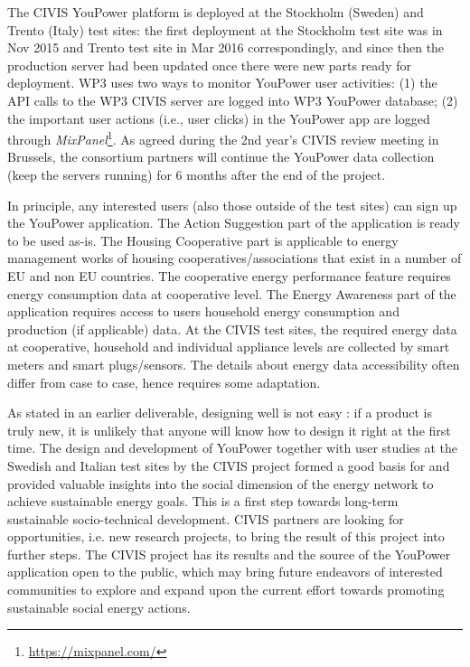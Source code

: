 The CIVIS YouPower platform is deployed at the Stockholm (Sweden) and Trento (Italy) test sites:  the first deployment at the Stockholm test site was in Nov 2015 and Trento test site in Mar 2016 correspondingly, and since then the production server had been updated once there were new parts ready for deployment. WP3 uses two ways to monitor YouPower user activities: (1) the API calls to the WP3 CIVIS server are logged into WP3 YouPower database; (2) the important user actions (i.e., user clicks) in the YouPower app are logged  through \textit{MixPanel}\footnote{\url{https://mixpanel.com/}}.
As agreed during the 2nd year's CIVIS review meeting in Brussels, the consortium partners  will continue the YouPower data collection (keep the servers running) for 6 months after the end of the project. 

In principle, any interested users (also those outside of the test sites) can sign up the YouPower application. The Action Suggestion part of the application is ready to be used as-is. The Housing Cooperative part is applicable to energy management works of housing cooperatives/associations that exist in a number of EU and non EU countries. The cooperative energy performance feature requires energy consumption data at cooperative level. The Energy Awareness part of the application requires access to users household energy consumption and production (if applicable) data. At the CIVIS test sites, the required energy data at cooperative, household and individual appliance levels are collected by smart meters and smart plugs/sensors. The details about energy data accessibility often differ from case to case, hence requires some adaptation. 

As stated in an earlier deliverable, designing well is not easy \citep{Norman2002}: if a product is truly new, it is unlikely that anyone will know how to design it right at the first time.  
The design and development of YouPower together with user studies at the Swedish and Italian test sites by the CIVIS project formed a good basis for and provided valuable insights into the social dimension of the energy network to achieve sustainable energy goals. This is a first step towards long-term sustainable socio-technical development.  
CIVIS partners are looking for opportunities, i.e. new research projects, to bring the result of this project into further steps. The CIVIS project has its results and the source of the YouPower application open to the public, which may bring future endeavors of interested communities to explore and expand upon the current effort towards promoting sustainable social energy actions. 



